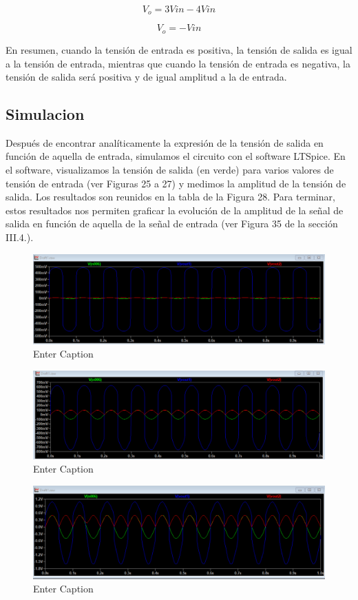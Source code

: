 \[V_o = 3V{in} - 4V{in}\]

\[V_o = - V{in} \]

En resumen, cuando la tensión de entrada es positiva, la tensión de salida es igual a la tensión de entrada, mientras que cuando la tensión de entrada es negativa, la tensión de salida será positiva y de igual amplitud a la de entrada.


\subsection{Simulacion}
Después de encontrar analíticamente la expresión de la tensión de salida en función de aquella de entrada, simulamos el circuito con el software LTSpice. En el
software, visualizamos la tensión de salida (en verde) para varios valores de tensión de entrada (ver Figuras 25 a 27) y medimos la amplitud de la tensión de salida. Los resultados son reunidos en la tabla de la Figura 28. Para terminar, estos resultados nos permiten graficar la evolución de la amplitud de la señal de salida en función de aquella de la señal de entrada (ver Figura 35 de la sección III.4.).

\begin{figure}
    \centering
    \includegraphics[width=0.5\linewidth]{Secciones/Circuito3/simulacion10mv.png}
    \caption{Enter Caption}
    \label{fig:enter-label}
\end{figure}

\begin{figure}
    \centering
    \includegraphics[width=0.5\linewidth]{Secciones/Circuito3/simulacion100mv.png}
    \caption{Enter Caption}
    \label{fig:enter-label}
\end{figure}

\begin{figure}
    \centering
    \includegraphics[width=0.5\linewidth]{Secciones/Circuito3/simulacion500mv.png}
    \caption{Enter Caption}
    \label{fig:enter-label}
\end{figure}

